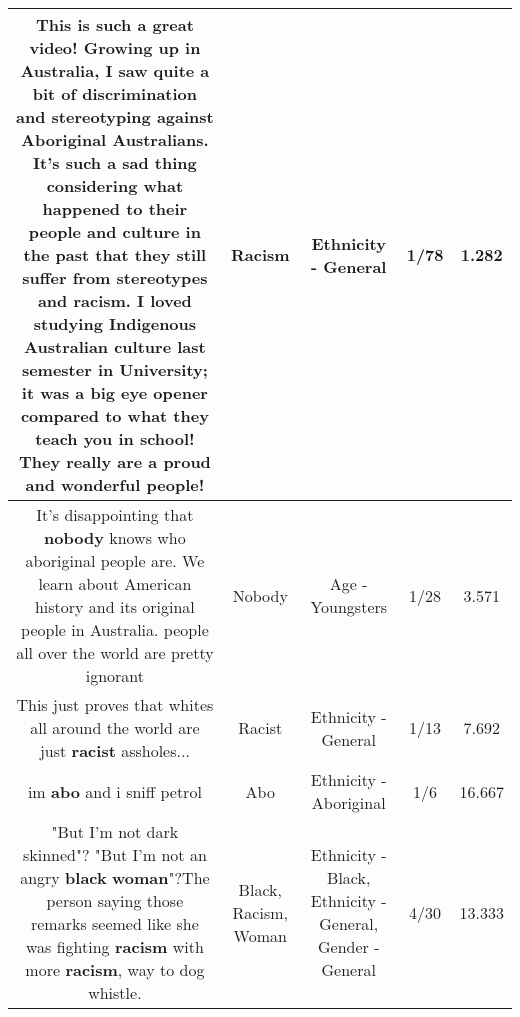 \documentclass[11pt]{article}
\newlength\mylength
\begin{document}
\begin{center}
\begin{longtable}{|C{.65\mylength}|C{.30\mylength}|C{.12\mylength}|C{.12\mylength}|C{.12\mylength}|}
  \small This is such a great video! Growing up in Australia, I saw quite a bit of discrimination and stereotyping against Aboriginal Australians. It's such a sad thing considering what happened to their people and culture in the past that they still suffer from stereotypes and \textbf{racism}. I loved studying Indigenous Australian culture last semester in University; it was a big eye opener compared to what they teach you in school! They really are a proud and wonderful people!\normalsize   & Racism & Ethnicity - General & 1/78 & 1.282 \\  \hline
  \small It's disappointing that \textbf{nobody} knows who aboriginal people are. We learn about American history and its original people in Australia. people all over the world are pretty ignorant\normalsize   & Nobody & Age - Youngsters & 1/28 & 3.571 \\  \hline
  \small This just proves that whites all around the world are just \textbf{racist} assholes...\normalsize   & Racist & Ethnicity - General & 1/13 & 7.692 \\  \hline
  \small im \textbf{abo} and i sniff petrol\normalsize   & Abo & Ethnicity - Aboriginal & 1/6 & 16.667 \\  \hline
  \small "But I'm not dark skinned"? "But I'm not an angry \textbf{black} \textbf{woman}"?The person saying those remarks seemed like she was fighting \textbf{racism} with more \textbf{racism}, way to dog whistle.\normalsize   & Black, Racism, Woman & Ethnicity - Black, Ethnicity - General, Gender - General & 4/30 & 13.333 \\  \hline

\end{longtable}
\end{center}
\end{document}
